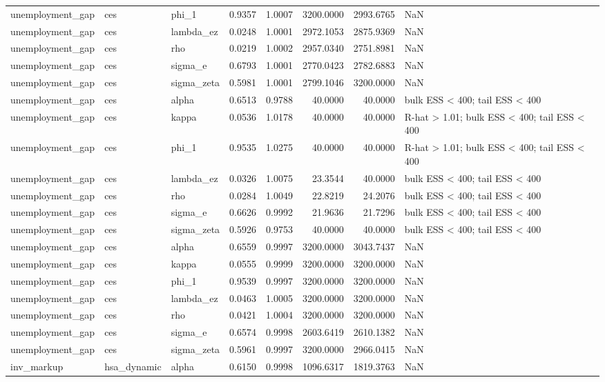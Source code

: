 \begin{tabular}{lllrrrrl}
unemployment\_gap & ces & phi\_1 & 0.9357 & 1.0007 & 3200.0000 & 2993.6765 & NaN \\
unemployment\_gap & ces & lambda\_ez & 0.0248 & 1.0001 & 2972.1053 & 2875.9369 & NaN \\
unemployment\_gap & ces & rho & 0.0219 & 1.0002 & 2957.0340 & 2751.8981 & NaN \\
unemployment\_gap & ces & sigma\_e & 0.6793 & 1.0001 & 2770.0423 & 2782.6883 & NaN \\
unemployment\_gap & ces & sigma\_zeta & 0.5981 & 1.0001 & 2799.1046 & 3200.0000 & NaN \\
unemployment\_gap & ces & alpha & 0.6513 & 0.9788 & 40.0000 & 40.0000 & bulk ESS < 400; tail ESS < 400 \\
unemployment\_gap & ces & kappa & 0.0536 & 1.0178 & 40.0000 & 40.0000 & R-hat > 1.01; bulk ESS < 400; tail ESS < 400 \\
unemployment\_gap & ces & phi\_1 & 0.9535 & 1.0275 & 40.0000 & 40.0000 & R-hat > 1.01; bulk ESS < 400; tail ESS < 400 \\
unemployment\_gap & ces & lambda\_ez & 0.0326 & 1.0075 & 23.3544 & 40.0000 & bulk ESS < 400; tail ESS < 400 \\
unemployment\_gap & ces & rho & 0.0284 & 1.0049 & 22.8219 & 24.2076 & bulk ESS < 400; tail ESS < 400 \\
unemployment\_gap & ces & sigma\_e & 0.6626 & 0.9992 & 21.9636 & 21.7296 & bulk ESS < 400; tail ESS < 400 \\
unemployment\_gap & ces & sigma\_zeta & 0.5926 & 0.9753 & 40.0000 & 40.0000 & bulk ESS < 400; tail ESS < 400 \\
unemployment\_gap & ces & alpha & 0.6559 & 0.9997 & 3200.0000 & 3043.7437 & NaN \\
unemployment\_gap & ces & kappa & 0.0555 & 0.9999 & 3200.0000 & 3200.0000 & NaN \\
unemployment\_gap & ces & phi\_1 & 0.9539 & 0.9997 & 3200.0000 & 3200.0000 & NaN \\
unemployment\_gap & ces & lambda\_ez & 0.0463 & 1.0005 & 3200.0000 & 3200.0000 & NaN \\
unemployment\_gap & ces & rho & 0.0421 & 1.0004 & 3200.0000 & 3200.0000 & NaN \\
unemployment\_gap & ces & sigma\_e & 0.6574 & 0.9998 & 2603.6419 & 2610.1382 & NaN \\
unemployment\_gap & ces & sigma\_zeta & 0.5961 & 0.9997 & 3200.0000 & 2966.0415 & NaN \\
inv\_markup & hsa\_dynamic & alpha & 0.6150 & 0.9998 & 1096.6317 & 1819.3763 & NaN \\

\end{tabular}
